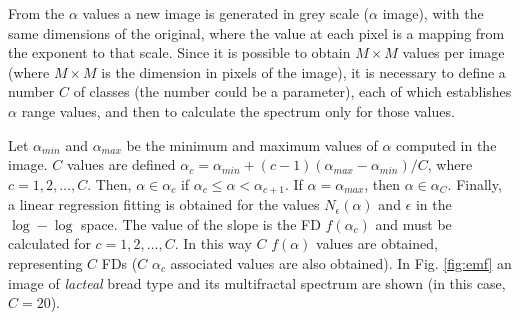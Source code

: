 \documentclass[oneside,a4paper,english,links,12pt]{article}
\begin{document}
From the $\alpha$ values a new image is generated in grey scale ($\alpha$ image), with the same dimensions of the original, where the value at each pixel is a mapping from the exponent to that scale. Since it is possible to obtain $M\times M$ values per image (where $M\times M$ is the dimension in pixels of the image), it is necessary to define a number $C$ of classes (the number could be a parameter), each of which establishes $\alpha$ range values, and then to calculate the spectrum only for those values.

Let $\alpha_{min}$ and  $\alpha_{max}$ be the minimum and maximum values of $\alpha$ computed in the image. $C$ values are defined $\alpha_{c} = \alpha_{min} + (c-1)(\alpha_{max}-\alpha_{min})/C$, where $c = 1,2,\dots,C$. Then, $\alpha \in \alpha_{c}$ if $\alpha_{c} \leq \alpha < \alpha_{c+1}$. If $\alpha = \alpha_{max}$, then $\alpha \in \alpha_{C}$. Finally, a linear regression fitting is obtained for the values $N_{\epsilon}(\alpha)$ and $\epsilon$ in the $\log-\log$ space. The value of the slope is the FD $f(\alpha_{c})$ and must be calculated for $c = 1,2,\dots,C$. In this way $C$ $f(\alpha)$ values are obtained, representing $C$ FDs ($C$ $\alpha_{c}$ associated values are also obtained). In Fig. \ref{fig:emf} an image of {\em lacteal} bread type and its multifractal spectrum are shown (in this case, $C = 20$).
\end{document}
